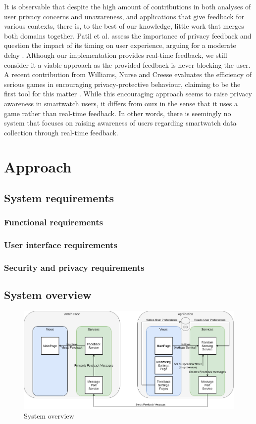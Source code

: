 \documentclass[conference, a4paper, 10pt, twocolumn]{IEEEtran}
\begin{document}
It is observable that despite the high amount of contributions in both analyses of user privacy concerns and unawareness, and applications that give feedback for various contexts, there is, to the best of our knowledge, little work that merges both domains together. Patil et al. assess the importance of privacy feedback and question the impact of its timing on user experience, arguing for a moderate delay \cite{patil2015interrupt}.  Although our implementation provides real-time feedback, we still consider it a viable approach as the provided feedback is never blocking the user. A recent contribution from Williams, Nurse and Creese evaluates the efficiency of serious games in encouraging privacy-protective behaviour, claiming to be the first tool for this matter \cite{williams2019smart}. While this encouraging approach seems to raise privacy awareness in smartwatch users, it differs from ours in the sense that it uses a game rather than real-time feedback. In other words, there is seemingly no system that focuses on raising awareness of users regarding smartwatch data collection through real-time feedback.  

\section{Approach}\label{approach}

\subsection{System requirements}

\subsubsection{Functional requirements}
\subsubsection{User interface requirements}
\subsubsection{Security and privacy requirements}

\subsection{System overview}

\begin{figure}[ht]
\centerline{\includegraphics[width=.9\textwidth]{img/appDiagram.png}}
\caption{System overview}
\label{fig:systemOverview}
\end{figure}
\end{document}
